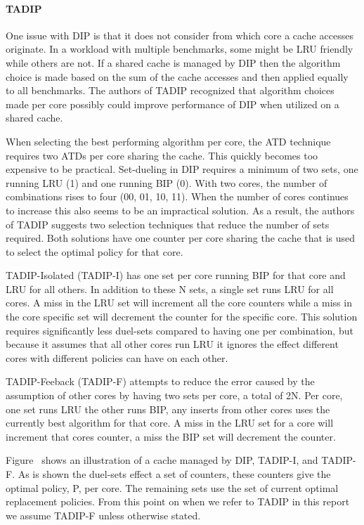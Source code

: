 \paragraph{TADIP}

One issue with DIP is that it does not consider from which core a cache accesses originate.
In a workload with multiple benchmarks, some might be LRU friendly while others are not. 
If a shared cache is managed by DIP then the algorithm choice is made based on the sum of the cache accesses and then applied equally to all benchmarks.
The authors of TADIP recognized that algorithm choices made per core possibly could improve performance of DIP when utilized on a shared cache.

When selecting the best performing algorithm per core, the ATD technique requires two ATDs per core sharing the cache. 
This quickly becomes too expensive to be practical.
Set-dueling in DIP requires a minimum of two sets, one running LRU (1) and one running BIP (0). 
With two cores, the number of combinations rises to four (00, 01, 10, 11).
When the number of cores continues to increase this also seems to be an impractical solution.
As a result, the authors of TADIP suggests two selection techniques that reduce the number of sets required. 
Both solutions have one counter per core sharing the cache that is used to select the optimal policy for that core.

TADIP-Isolated (TADIP-I) has one set per core running BIP for that core and LRU for all others.
In addition to these N sets, a single set runs LRU for all cores. 
A miss in the LRU set will increment all the core counters while a miss in the core specific set will decrement the counter for the specific core.
This solution requires significantly less duel-sets compared to having one per combination, but because it assumes that all other cores run LRU it ignores the effect different cores with different policies can have on each other.

TADIP-Feeback (TADIP-F) attempts to reduce the error caused by the assumption of other cores by having two sets per core, a total of 2N.
Per core, one set runs LRU the other runs BIP, any inserts from other cores uses the currently best algorithm for that core.
A miss in the LRU set for a core will increment that cores counter, a miss the BIP set will decrement the counter.


Figure~ shows an illustration of a cache managed by DIP, TADIP-I, and TADIP-F. 
As is shown the duel-sets effect a set of counters, these counters give the optimal policy, P, per core. 
The remaining sets use the set of current optimal replacement policies.
From this point on when we refer to TADIP in this report we assume TADIP-F unless otherwise stated.


